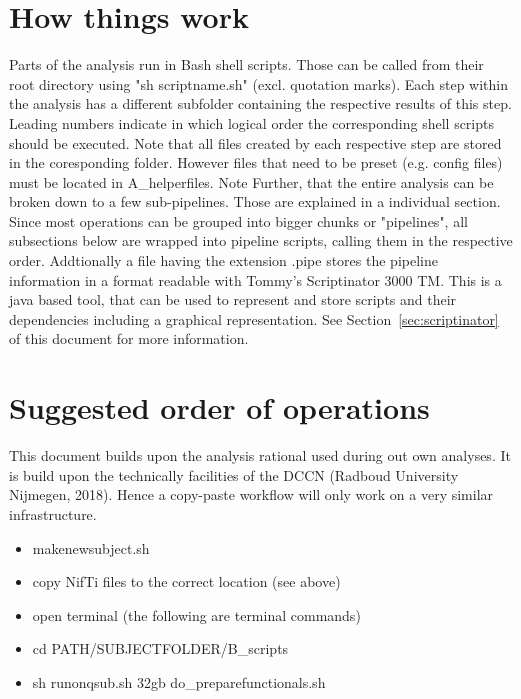 \documentclass[12pt,a4paper]{scrartcl}
\begin{document}
\section{How things work}
Parts of the analysis run in Bash shell scripts. Those can be called from their root directory using "sh scriptname.sh" (excl. quotation marks). Each step within the analysis has a different subfolder containing the respective results of this step. Leading numbers indicate in which logical order the corresponding shell scripts should be executed. Note that all files created by each respective step are stored in the coresponding folder. However files that need to be preset (e.g. config files) must be located in A\_helperfiles. Note Further, that the entire analysis can be broken down to a few sub-pipelines. Those are explained in a individual section.\\

\noindent Since most operations can be grouped into bigger chunks or "pipelines", all subsections below are wrapped into pipeline scripts, calling them in the respective order. Addtionally a file having the extension .pipe stores the pipeline information in a format readable with Tommy's Scriptinator 3000 TM. This is a java based tool, that can be used to represent and store scripts and their dependencies including a graphical representation. See Section~\ref{sec:scriptinator} of this document for more information.

\section{Suggested order of operations}
This document builds upon the analysis rational used during out own analyses. It is build upon the technically facilities of the DCCN (Radboud University Nijmegen, 2018). Hence a copy-paste workflow will only work on a very similar infrastructure.
\begin{itemize}
\item makenewsubject.sh
\item copy NifTi files to the correct location (see above)
\item open terminal (the following are terminal commands)
\item cd PATH/SUBJECTFOLDER/B\_scripts
\item sh runonqsub.sh 32gb do\_preparefunctionals.sh
\end{itemize}
\end{document}
